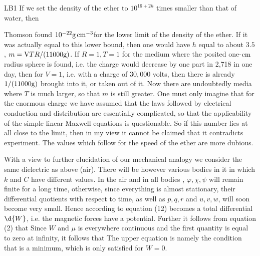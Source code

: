 \begin{paper}{LB1}
If we set the density of the ether to $10^{16+2h}$ times smaller than that of water, then

Thomson found $10^{-22}\gram\,\cm^{-3}$for the lower limit of the density of the ether. If it was actually equal to this lower bound, then one would have $h$ equal to about $3.5$, $m=\volts TR/(11000\gram)$. If $R=1,T=1$ for the medium where the posited one-$\cm$ radius sphere is found, i.e. the charge would decrease by one part in 2,718 in one day, then for $V=1$, i.e. with a charge of $30,000$ volts, then there is already $1/(11000\gram)$ brought into it, or taken out of it. Now there are undoubtedly media where $T$ is much larger, so that $m$ is still greater. One must only imagine that for the enormous charge we have assumed that the laws followed by electrical conduction and distribution are essentially complicated, so that the applicability of the simple linear Maxwell equations is questionable. So if this number lies at all close to the limit, then in my view it cannot be claimed that it contradicts experiment. The values which follow for the speed of the ether are more dubious.

With a view to further elucidation of our mechanical analogy we consider the same dielectric as above (air). There will be however various bodies in it in which $k$ and $C$ have different values. In the air and in all bodies , $\varphi, \chi, \psi$ will remain finite for a long time, otherwise, since everything is almost stationary, their differential quotients with respect to time, as well as $p,q,r$ and $u,v,w$, will soon become very small. Hence according to equation (12)
becomes a total differential $\d{W}$, i.e. the magnetic forces have a potential. Further it follows from equation (2) that
Since $W$ and $\mu$ is everywhere continuous and the first quantity is equal to zero at infinity, it follows that
The upper equation is namely the condition that
is a minimum, which is only satisfied for $W=0$.


\end{paper}

